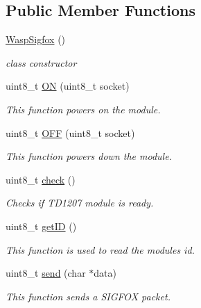 \subsection*{Public Member Functions}
\begin{DoxyCompactItemize}
\item 
\hyperlink{class_wasp_sigfox_ad7b6ac8a4b3e1e17b40c02f8d3015595}{Wasp\+Sigfox} ()\hypertarget{class_wasp_sigfox_ad7b6ac8a4b3e1e17b40c02f8d3015595}{}\label{class_wasp_sigfox_ad7b6ac8a4b3e1e17b40c02f8d3015595}

\begin{DoxyCompactList}\small\item\em class constructor \end{DoxyCompactList}\item 
uint8\+\_\+t \hyperlink{class_wasp_sigfox_ab78838f6ddfec09ffcd32a25d7cf319f}{ON} (uint8\+\_\+t socket)
\begin{DoxyCompactList}\small\item\em This function powers on the module. \end{DoxyCompactList}\item 
uint8\+\_\+t \hyperlink{class_wasp_sigfox_a610d849290be2fa628f36ac600a2fde0}{O\+FF} (uint8\+\_\+t socket)
\begin{DoxyCompactList}\small\item\em This function powers down the module. \end{DoxyCompactList}\item 
uint8\+\_\+t \hyperlink{class_wasp_sigfox_a2055732b51652822c3aca0b2c88e939f}{check} ()
\begin{DoxyCompactList}\small\item\em Checks if T\+D1207 module is ready. \end{DoxyCompactList}\item 
uint8\+\_\+t \hyperlink{class_wasp_sigfox_a2e8425f17dd6a64cedfd888ea1a2d180}{get\+ID} ()
\begin{DoxyCompactList}\small\item\em This function is used to read the module\textquotesingle{}s id. \end{DoxyCompactList}\item 
uint8\+\_\+t \hyperlink{class_wasp_sigfox_a482844b56ed98a2e3c4e75fa912cc2aa}{send} (char $\ast$data)
\begin{DoxyCompactList}\small\item\em This function sends a S\+I\+G\+F\+OX packet. \end{DoxyCompactList}\item 

\end{DoxyCompactItemize}
